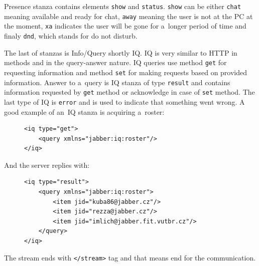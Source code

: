 Presence stanza contains elements \verb|show| and \verb|status|. \verb|show| can be either \verb|chat| meaning available and ready for chat, \verb|away| meaning the user is not at the PC at the moment, \verb|xa| indicates the user will be gone for a~longer period of time and finaly \verb|dnd|, which stands for do not disturb.  

The last of stanzas is Info/Query shortly IQ. IQ is very similar to HTTP in methods and in the query-answer nature. IQ queries use method \verb|get| for requesting information and method \verb|set| for making requests based on provided information. Answer to a~query is IQ stanza of type \verb|result| and contains information requested by \verb|get| method or acknowledge in case of \verb|set| method. The last type of IQ is \verb|error| and is used to indicate that something went wrong. A good example of an~IQ stanza is acquiring a~roster: 

\begin{figure}[h]
\begin{lstlisting}
<iq type="get">
	<query xmlns="jabber:iq:roster"/>
</iq>
\end{lstlisting}
\end{figure}

And the server replies with:

\begin{figure}[h]
\begin{lstlisting}
<iq type="result">
	<query xmlns="jabber:iq:roster">
		<item jid="kuba86@jabber.cz"/>
		<item jid="rezza@jabber.cz"/>
		<item jid="imlich@jabber.fit.vutbr.cz"/>
	</query>
</iq>
\end{lstlisting}
\end{figure}

The stream ends with \verb|</stream>| tag and that means end for the communication. 

